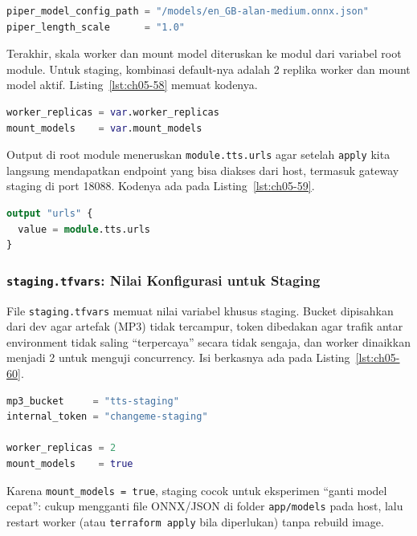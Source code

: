 \begin{lstlisting}[language=terraform, caption={Potongan staging/main.tf: konfigurasi Piper}, label={lst:ch05-57}]
piper_model_config_path = "/models/en_GB-alan-medium.onnx.json"
piper_length_scale      = "1.0"
\end{lstlisting}

Terakhir, skala worker dan mount model diteruskan ke modul dari variabel root module. Untuk staging, kombinasi default-nya adalah 2 replika worker dan mount model aktif. Listing~\ref{lst:ch05-58} memuat kodenya.

\begin{lstlisting}[language=terraform, caption={Potongan kode Terraform pada main.tf (14)}, label={lst:ch05-58}]
worker_replicas = var.worker_replicas
mount_models    = var.mount_models
\end{lstlisting}

Output di root module meneruskan \texttt{module.tts.urls} agar setelah \texttt{apply} kita langsung mendapatkan endpoint yang bisa diakses dari host, termasuk gateway staging di port 18088. Kodenya ada pada Listing~\ref{lst:ch05-59}.

\begin{lstlisting}[language=terraform, caption={Potongan kode Terraform pada main.tf (15)}, label={lst:ch05-59}]
output "urls" {
  value = module.tts.urls
}
\end{lstlisting}

\subsubsection{\texttt{staging.tfvars}: Nilai Konfigurasi untuk Staging}

File \texttt{staging.tfvars} memuat nilai variabel khusus staging. Bucket dipisahkan dari dev agar artefak (MP3) tidak tercampur, token dibedakan agar trafik antar environment tidak saling ``terpercaya'' secara tidak sengaja, dan worker dinaikkan menjadi 2 untuk menguji concurrency. Isi berkasnya ada pada Listing~\ref{lst:ch05-60}.

\begin{lstlisting}[language=terraform, caption={Isi berkas staging.tfvars}, label={lst:ch05-60}]
mp3_bucket     = "tts-staging"
internal_token = "changeme-staging"

worker_replicas = 2
mount_models    = true
\end{lstlisting}

Karena \texttt{mount\_models = true}, staging cocok untuk eksperimen ``ganti model cepat'': cukup mengganti file ONNX/JSON di folder \texttt{app/models} pada host, lalu restart worker (atau \texttt{terraform apply} bila diperlukan) tanpa rebuild image.

